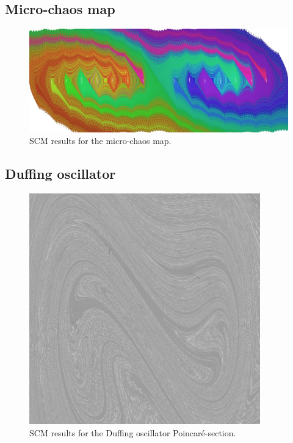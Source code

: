 \documentclass[11pt]{article}
\begin{document}
\subsection{Micro-chaos map}

\begin{figure}[h]
	\centering
	\includegraphics[width=14cm]{fig/microchaos.jpg}
	\caption{SCM results for the micro-chaos map.}
\end{figure}

\subsection{Duffing oscillator}

\begin{figure}[h]
	\centering
	\includegraphics[width=10cm]{fig/duffing.jpg}
	\caption{SCM results for the Duffing oscillator Poincaré-section.}
\end{figure}
\end{document}
